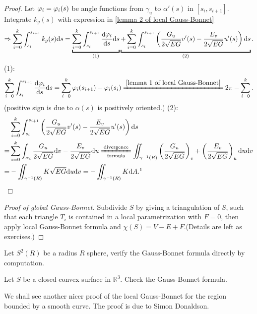 \begin{proof}
    Let \(\varphi_i=\varphi_i(s)\) be angle functions from \(\gamma_u\)
    to \(\alpha'(s)\) in \([s_i,s_{i+1}]\). Integrate \(k_g(s)\)
    with expression in \cref{lemma 2 of local Gauss-Bonnet}
    \[
        \Rightarrow \sum_{i=0}^k\int_{s_i}^{s_{i+1}}
        k_g(s)\dd s=
        \underbracket{
            \sum_{i=0}^k \int_{s_i}^{s_{i+1}}
            \dv{\vphi_i}{s}\dd s
        }_{\text{(1)}}
        \underbracket{
            +\sum_{i=0}^k\int_{s_i}^{s_{i+1}}
        \left(
            \frac{G_u}{2\sqrt{EG}}v'(s)
            -\frac{E_v}{2\sqrt{E G}}u'(s)
        \right)\dd s
        }_{(2)}.
    \]
    (1): 
    \[
        \sum_{i=0}^k \int_{s_i}^{s_{i+1}}
            \dv{\vphi_i}{s}\dd s 
        =\sum_{i=0}^k\vphi_i(s_{i+1})-\vphi_i(s_i)
        \xlongequal{\cref{lemma 1 of local Gauss-Bonnet}}%
        2\pi-\sum_{i=0}^k. 
    \]
    (positive sign is due to \(\alpha(s)\) is positively oriented.)
    (2):
    \begin{align*}
        &\sum_{i=0}^k\int_{s_i}^{s_{i+1}}
        \left(
            \frac{G_u}{2\sqrt{EG}}v'(s)
            -\frac{E_v}{2\sqrt{E G}}u'(s)
        \right)\dd s\\
        =& \sum_{i=0}^k \int_{\alpha_i}
        \frac{G_u}{2\sqrt{EG}}\dd v
        -\frac{E_v}{2\sqrt{E G}}\dd u
        \xlongequal[\text{formula}]{\text{divergence}}%
        \iint_{\gamma^{-1}(R)}\left(\frac{G_u}{2\sqrt{EG}}\right)_v
        +\left(\frac{E_v}{2\sqrt{E G}}\right)_u \dd u\dd v\\
        =&-\iint_{\gamma^{-1}(R)}K\sqrt{EG}\dd u\dd v
        =-\iint_{\gamma^{-1}(R)}K \dd A.
        \footnotemark
    \end{align*}
\end{proof}
\begin{proof}[Proof of global Gauss-Bonnet]
    Subdivide \(S\) by giving a triangulation of \(S\), such that
    each triangle \(T_i\) is contained in a local parametrization
    with \(F=0\), then apply local Gauss-Bonnet formula and
    \(\chi(S)=V-E+F\).(Details are left as exercises.)
\end{proof}
\begin{exercise}
    Let \(S^2(R)\) be a radius \(R\) sphere, verify the Gauss-Bonnet
    formula directly by computation.
\end{exercise}
\begin{exercise}
    Let \(S\) be a closed convex surface in \(\mathbb{R}^3\). Check the
    Gauss-Bonnet formula.
\end{exercise}
\begin{remark}
    We shall see another nicer proof of the local Gauss-Bonnet for the
    region bounded by a smooth curve. The proof is due to Simon
    Donaldson.
\end{remark}